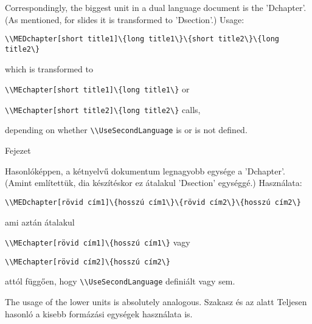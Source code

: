 
{
Correspondingly, the biggest unit in a dual language document is the 'Dchapter'.
(As mentioned, for slides it is transformed to 'Dsection'.)
Usage:\par
\noindent\lstinline|\\MEDchapter[short title1]\{long title1\}\{short title2\}\{long title2\}|
\par\noindent which is transformed to
\par\noindent\lstinline|\\MEchapter[short title1]\{long title1\}| or
\par\noindent\lstinline|\\MEchapter[short title2]\{long title2\}| calls,
\par\noindent depending on whether \lstinline|\\UseSecondLanguage| is or is not defined.
}
{Fejezet}
{

Hasonlóképpen, a kétnyelvű dokumentum legnagyobb egysége a 'Dchapter'.
(Amint említettük, dia készítéskor ez átalakul 'Dsection' egységgé.)
Használata:\par
\noindent\lstinline|\\MEDchapter[rövid cím1]\{hosszú cím1\}\{rövid cím2\}\{hosszú cím2\}|
\par\noindent ami aztán átalakul 
\par\noindent\lstinline|\\MEchapter[rövid cím1]\{hosszú cím1\}| vagy
\par\noindent\lstinline|\\MEchapter[rövid cím2]\{hosszú cím2\}| 
\par\noindent attól függően, hogy  \lstinline|\\UseSecondLanguage| definiált vagy sem.
}



{
The usage of the lower units is absolutely analogous.
}
{Szakasz és az alatt}
{
Teljesen hasonló a kisebb formázási egységek használata is.
}


